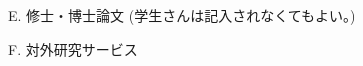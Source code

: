 \documentclass[a4j,twocolumn]{jarticle}
\begin{document}
\vspace{0.1cm}



\vspace{0.2cm}




\noindent
E. 修士・博士論文 (学生さんは記入されなくてもよい。)

\vspace{0.1cm}



\vspace{0.2cm}
\noindent
F. 対外研究サービス

\vspace{0.1cm}
\end{document}
